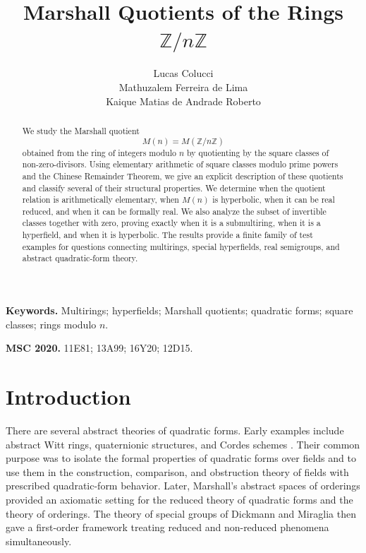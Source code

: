 \documentclass[a4paper,10pt]{article}
\begin{document}
\title{Marshall Quotients of the Rings $\mathbb Z/n\mathbb Z$}

\author{Lucas Colucci \\ Mathuzalem Ferreira de Lima\\ Kaique Matias de Andrade Roberto}

\date{}
\maketitle


\begin{abstract}
We study the Marshall quotient
\[
        M(n)=M(\mathbb Z/n\mathbb Z)
\]
obtained from the ring of integers modulo $n$ by quotienting by the square classes of non-zero-divisors.  Using elementary arithmetic of square classes modulo prime powers and the Chinese Remainder Theorem, we give an explicit description of these quotients and classify several of their structural properties.  We determine when the quotient relation is arithmetically elementary, when $M(n)$ is hyperbolic, when it can be real reduced, and when it can be formally real.  We also analyze the subset of invertible classes together with zero, proving exactly when it is a submultiring, when it is a hyperfield, and when it is hyperbolic.  The results provide a finite family of test examples for questions connecting multirings, special hyperfields, real semigroups, and abstract quadratic-form theory.
\end{abstract}

\noindent\textbf{Keywords.} Multirings; hyperfields; Marshall quotients; quadratic forms; square classes; rings modulo $n$.

\noindent\textbf{MSC 2020.} 11E81; 13A99; 16Y20; 12D15.

\section{Introduction}

There are several abstract theories of quadratic forms.  Early examples include abstract Witt rings, quaternionic structures, and Cordes schemes \cite{marshall1980abstract}.  Their common purpose was to isolate the formal properties of quadratic forms over fields and to use them in the construction, comparison, and obstruction theory of fields with prescribed quadratic-form behavior.  Later, Marshall's abstract spaces of orderings \cite{marshall1996spaces} provided an axiomatic setting for the reduced theory of quadratic forms and the theory of orderings.  The theory of special groups of Dickmann and Miraglia \cite{dickmann2000special} then gave a first-order framework treating reduced and non-reduced phenomena simultaneously.
\end{document}

